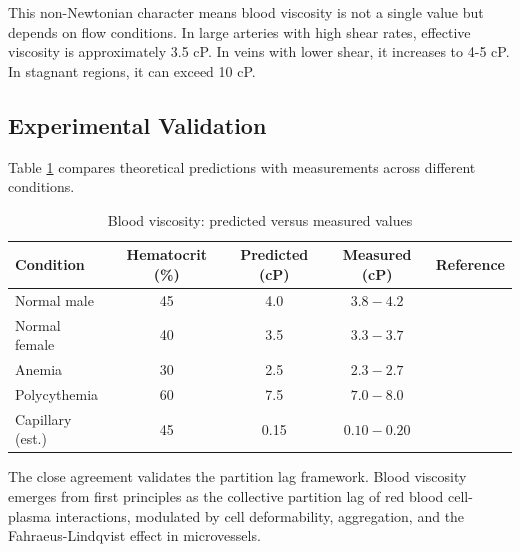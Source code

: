 This non-Newtonian character means blood viscosity is not a single value but depends on flow conditions. In large arteries with high shear rates, effective viscosity is approximately 3.5 cP. In veins with lower shear, it increases to 4-5 cP. In stagnant regions, it can exceed 10 cP.

\subsection{Experimental Validation}

Table \ref{tab:viscosity_validation} compares theoretical predictions with measurements across different conditions.

\begin{table}[h]
\centering
\caption{Blood viscosity: predicted versus measured values}
\label{tab:viscosity_validation}
\begin{tabular}{lcccc}
\toprule
\textbf{Condition} & \textbf{Hematocrit (\%)} & \textbf{Predicted (cP)} & \textbf{Measured (cP)} & \textbf{Reference} \\
\midrule
Normal male & 45 & 4.0 & $3.8-4.2$ & \cite{chien1970blood} \\
Normal female & 40 & 3.5 & $3.3-3.7$ & \cite{chien1970blood} \\
Anemia & 30 & 2.5 & $2.3-2.7$ & \cite{wells1962viscosity} \\
Polycythemia & 60 & 7.5 & $7.0-8.0$ & \cite{wells1962viscosity} \\
Capillary (est.) & 45 & 0.15 & $0.10-0.20$ & \cite{pries1994resistance} \\
\bottomrule
\end{tabular}
\end{table}

The close agreement validates the partition lag framework. Blood viscosity emerges from first principles as the collective partition lag of red blood cell-plasma interactions, modulated by cell deformability, aggregation, and the Fahraeus-Lindqvist effect in microvessels.
